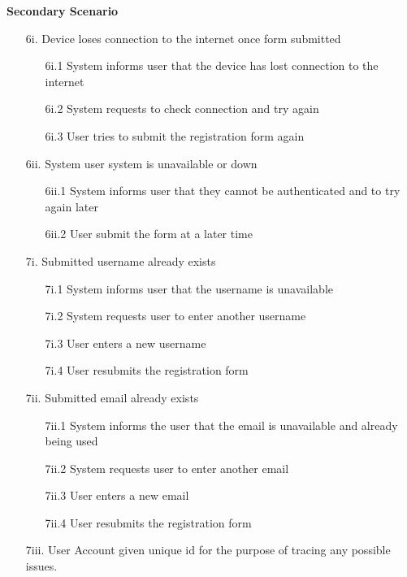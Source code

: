 \documentclass[]{article}
\begin{document}
\begin{enumerate}[{\bf {BE}1.}]
    {\bf Secondary Scenario} \\
    \begin{enumerate}
		\item [6i.] Device loses connection to the internet once form submitted
		\begin{enumerate}
			\item [6i.1] System informs user that the device has lost connection to the internet
			\item [6i.2] System requests to check connection and try again
			\item [6i.3] User tries to submit the registration form again
		\end{enumerate}

		\item [6ii.] System user system is unavailable or down
		\begin{enumerate}
			\item [6ii.1] System informs user that they cannot be authenticated and to try again later
			\item [6ii.2] User submit the form at a later time
		\end{enumerate}

		\item [7i.] Submitted username already exists
		\begin{enumerate}
			\item [7i.1] System informs user that the username is unavailable
			\item [7i.2] System requests user to enter another username
			\item [7i.3] User enters a new username
			\item [7i.4] User resubmits the registration form
		\end{enumerate}

		\item [7ii.] Submitted email already exists
		\begin{enumerate}
			\item [7ii.1] System informs the user that the email is unavailable and already being used
			\item [7ii.2] System requests user to enter another email
			\item [7ii.3] User enters a new email
			\item [7ii.4] User resubmits the registration form
		\end{enumerate}
		
		\item [7iii.] User Account given unique id for the purpose of tracing any possible issues.
    

\end{enumerate}
\end{enumerate}
\end{document}
